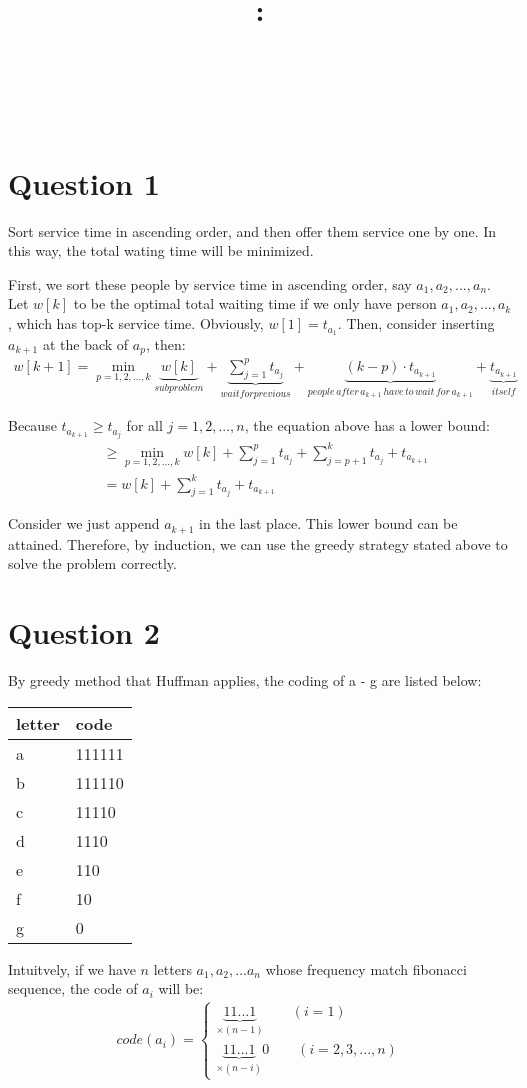 \documentclass{article}
\title{
    \vspace{2in}
    \textmd{\textbf{\courseName}:\homeworkTitle}\\
    \vspace{0.1in}
    \large{\studentId}\\
    \large{\studentName}\\
    \vspace{3in}
}
\newcommand{\question}[1]{\section*{Question #1}}
\begin{document}
\maketitle
\date{}
\pagebreak


\question{1}
Sort service time in ascending order, and then offer them service one by one. In this way, the total wating time will be minimized. \par
First, we sort these people by service time in ascending order, say $a_1, a_2, ..., a_n$.
Let $w[k]$ to be the optimal total waiting time if we only have person $a_1, a_2, ..., a_k$, which has top-k service time. Obviously, $w[1] = t_{a_1}$. Then, consider inserting $a_{k + 1}$ at the back of $a_p$, then:
\begin{align}
  w[k + 1] = \min_{p = 1, 2, ..., k} \underbrace{w[k]}_{subproblem} + \underbrace{ \sum_{j = 1}^p t_{a_j}}_{wait for previous} + \underbrace{(k - p) \cdot t_{a_{k + 1}}}_{people\, after\, a_{k + 1} \, have \, to \, wait\, for\, a_{k + 1}} + \underbrace{t_{a_{k + 1}}}_{itself}
\end{align} \par
Because $t_{a_{k + 1}} \geq t_{a_j}$ for all $j = 1, 2, ..., n$, the equation above has a lower bound:
\begin{align}
  &\geq \min_{p = 1, 2, ..., k} w[k] + \sum_{j = 1}^p t_{a_j} + \sum_{j = p + 1}^k t_{a_j} + t_{a_{k + 1}} \\
  &= w[k] + \sum_{j = 1}^k t_{a_j} + t_{a_{k + 1}}
\end{align} \par
Consider we just append $a_{k + 1}$ in the last place. This lower bound can be attained. Therefore, by induction, we can use the greedy strategy stated above to solve the problem correctly.

\question{2}
By greedy method that Huffman applies, the coding of a - g are listed below: \\
\begin{table}[htbp]
  \centering
\begin{tabular}{|l|l|}
\hline
letter & code   \\
\hline
a      & 111111 \\
\hline
b      & 111110 \\
\hline
c      & 11110  \\
\hline
d      & 1110   \\
\hline
e      & 110    \\
\hline
f      & 10     \\
\hline
g      & 0     \\
\hline
\end{tabular}
\end{table} \par
Intuitvely, if we have $n$ letters $a_1, a_2, ... a_n$ whose frequency match fibonacci sequence, the code of $a_i$ will be:
\begin{align}
  code(a_i) = \begin{cases}
  \underbrace{11...1}_{\times (n - 1)} \qquad (i = 1) \\
  \underbrace{11...1}_{\times (n - i)}0 \qquad (i = 2, 3, ..., n)
\end{cases}
\end{align}
\end{document}
